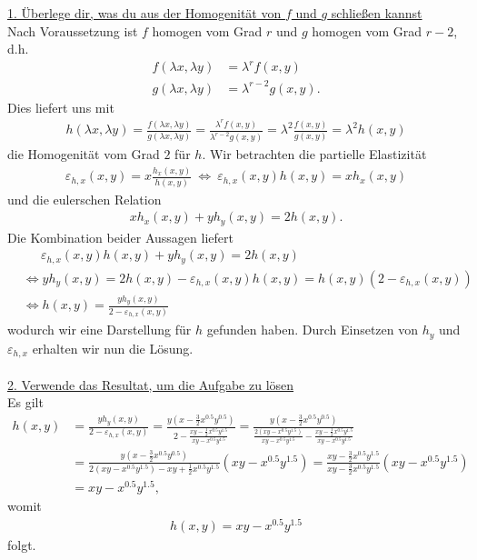 \underline{1. Überlege dir, was du aus der Homogenität von $ f $ und $ g $ schließen kannst}\\
Nach Voraussetzung ist $ f $ homogen vom Grad $ r $ und $ g $ homogen vom Grad $ r-2 $, d.h.
\begin{align*}
f(\lambda x , \lambda y) &= \lambda^r f(x,y)\\
g(\lambda x , \lambda y) &= \lambda^{r-2} g(x,y).
\end{align*}
Dies liefert uns mit
\begin{align*}
h(\lambda x , \lambda y)
= 
\frac{f(\lambda x , \lambda y)}{g(\lambda x , \lambda y)}
=
\frac{\lambda^{r} f(x,y)}{\lambda^{r-2} g(x,y)}
=
\lambda^2 \frac{f(x,y)}{g(x,y)}
=
\lambda^2 h(x,y)
\end{align*}
die Homogenität vom Grad $ 2 $ für $ h $.
Wir betrachten die partielle Elastizität
\begin{align*}
\varepsilon_{h,x}(x,y) = x \frac{h_x(x,y)}{h(x,y)}
\
\Leftrightarrow
\
\varepsilon_{h,x}(x,y) h(x,y) = x h_x(x,y)
\end{align*}
und die eulerschen Relation
\begin{align*}
x h_x(x,y) + y h_y(x,y) = 2 h(x,y).
\end{align*}
Die Kombination beider Aussagen liefert
\begin{align*}
&\quad \ \ \varepsilon_{h,x}(x,y) h(x,y) + y h_y(x,y) = 2 h(x,y)\\
&\Leftrightarrow
y h_y(x,y) = 2 h(x,y)- \varepsilon_{h,x}(x,y) h(x,y) =
h(x,y) ( 2 - \varepsilon_{h,x}(x,y)) \\
&\Leftrightarrow
h(x,y) = \frac{y h_y(x,y)}{2 - \varepsilon_{h,x}(x,y)} 
\end{align*}
wodurch wir eine Darstellung für $ h $ gefunden haben.
Durch Einsetzen von $ h_y $ und $ \varepsilon_{h,x} $ erhalten wir nun die Lösung.
\\
\\
\underline{2. Verwende das Resultat, um die Aufgabe zu lösen}\\
Es gilt
\begin{align*}
h(x,y) &= \frac{y h_y(x,y)}{2 - \varepsilon_{h,x}(x,y)} 
=
\frac{y \left( x  - \frac{3}{2} x^{0.5} y^{0.5} \right)}{2 -  
	\frac{xy - \frac{1}{2}x^{0.5} y^{1.5}}{xy - x^{0.5} y^{1.5}}
	}
=
\frac{y \left( x  - \frac{3}{2} x^{0.5} y^{0.5} \right)}
{\frac{2 (xy - x^{0.5} y^{1.5})}{xy - x^{0.5} y^{1.5}} -  
	\frac{xy - \frac{1}{2}x^{0.5} y^{1.5}}{xy - x^{0.5} y^{1.5}}
}\\
&=
\frac{y \left( x  - \frac{3}{2} x^{0.5} y^{0.5} \right)}
{2 (xy - x^{0.5} y^{1.5}) -  
	xy + \frac{1}{2}x^{0.5} y^{1.5}
}
(xy - x^{0.5} y^{1.5})
=
\frac{  xy  - \frac{3}{2} x^{0.5} y^{1.5} }
{xy  -  
	 \frac{3}{2}x^{0.5} y^{1.5}
}
(xy - x^{0.5} y^{1.5})\\
&=
xy - x^{0.5} y^{1.5}, 
\end{align*}
womit 
\begin{align*}
h(x,y) = xy - x^{0.5} y^{1.5}
\end{align*}
folgt.